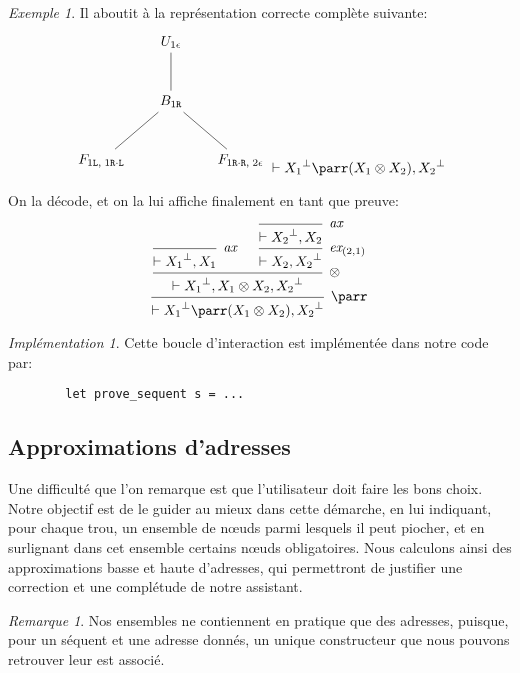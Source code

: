 \documentclass[11pt,a4paper]{article}
\theoremstyle{plain}
\theoremstyle{definition}
\theoremstyle{remark}
\newtheorem{remark}{Remarque}
\newtheorem{example}{Exemple}
\newtheorem{implementation}{Implémentation}
\newcommand*{\orth}{^\perp}
\newcommand*{\tensor}{\otimes}
\newcommand*{\axv}[1]{\infer{0}[\ensuremath{\mathit{ax}}]{\vdash #1}}
\newcommand*{\tensorv}[1]{\infer{2}[\ensuremath{\tensor}]{\vdash #1}}
\newcommand*{\parrv}[1]{\infer{1}[\ensuremath{\parr}]{\vdash #1}}
\newcommand*{\permv}[2]{\infer{1}[\ensuremath{\textit{ex}_{#1}}]{\vdash #2}}
\newcommand*{\Left}{\textnormal{\texttt{L}}}
\newcommand*{\Right}{\textnormal{\texttt{R}}}
\begin{document}
\begin{example}
    Il aboutit à la représentation correcte complète suivante:
    \begin{equation*}
        \begin{tikzpicture}%
            [level 2/.style={sibling distance=3.5cm}]
            \node {$U_{1 \epsilon}$}
            child {node {$B_{1 \Right}$}
                child {node {$F_{1 \Left, \; 1 \Right \cdot \Left}$}}
                child {node {$F_{1 \Right \cdot \Right, \; 2 \epsilon}$}}
            };
        \end{tikzpicture}
        \vdash {X_1}\orth \parr (X_1 \tensor X_2), {X_2}\orth
    \end{equation*}
    
    On la décode, et on la lui affiche finalement en tant que preuve:
    \begin{equation*}
        \begin{prooftree}
            \axv{{X_1}\orth, X_1}
            \axv{{X_2}\orth, X_2}
            \permv{(2, 1)}{X_2, {X_2}\orth}
            \tensorv{{X_1}\orth, X_1 \tensor X_2, {X_2}\orth}
            \parrv{{X_1}\orth \parr (X_1 \tensor X_2), {X_2}\orth}
        \end{prooftree}
    \end{equation*}
\end{example}

\begin{implementation}
    Cette boucle d'interaction est implémentée dans notre code par:

    \begin{verbatim}
        let prove_sequent s = ...
    \end{verbatim}
\end{implementation}

\subsection{Approximations d'adresses}

Une difficulté que l'on remarque est que l'utilisateur doit faire les bons choix. Notre objectif est de le guider au mieux dans cette démarche, en lui indiquant, pour chaque trou, un ensemble de n\oe{}uds parmi lesquels il peut piocher, et en surlignant dans cet ensemble certains n\oe{}uds obligatoires. Nous calculons ainsi des approximations basse et haute d'adresses, qui permettront de justifier une correction et une complétude de notre assistant.

\begin{remark}
    Nos ensembles ne contiennent en pratique que des adresses, puisque, pour un séquent et une adresse donnés, un unique constructeur que nous pouvons retrouver leur est associé. 
\end{remark}
\end{document}
